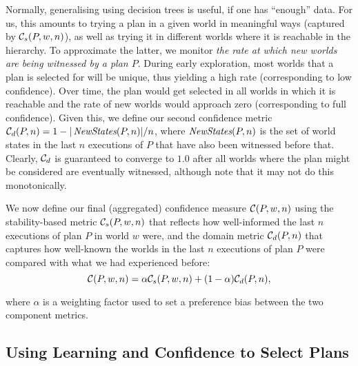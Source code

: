\newcommand{\neww}{\mathname{NewStates}}
Normally, generalising using decision trees is useful, if one has ``enough'' data. For us, this amounts to trying a plan in a given world in meaningful ways (captured by ${\mathcal{C}}_s(P,w,n)$), as well as trying it in different worlds where it is reachable in the hierarchy. To approximate the latter, we monitor {\em the rate at which new worlds are being witnessed by a  plan $P$}. During early exploration, most worlds that a plan is selected for will be unique, thus yielding a high rate (corresponding to low confidence). Over time, the plan would get selected in all worlds in which it is reachable and the rate of new worlds would approach zero (corresponding to full confidence). Given this, we define our second confidence metric $\C_d(P,n) = 1 - |\neww(P,n)|/n$, where $\neww(P,n)$ is the set of world states in the last $n$ executions of $P$ that have also been witnessed before that. Clearly, ${\mathcal{C}}_d$ is guaranteed to converge to $1.0$ after all worlds where the plan might be considered are eventually witnessed, although note that it may not do this monotonically.

We now define our final (aggregated) confidence measure ${\mathcal{C}}(P,w,n)$ using the stability-based metric ${\mathcal{C}}_s(P,w,n)$ that reflects how well-informed the last $n$ executions of plan $P$ in world $w$ were, and the domain metric ${\mathcal{C}}_d(P,n)$ that captures how well-known the worlds in the last $n$ executions of plan $P$ were compared with what we had experienced before:
\[
	{\mathcal{C}}(P,w,n) = \alpha{\ensuremath{\mathcal{C}}}_s(P,w,n) + (1-\alpha){\mathcal{C}}_d(P,n),
\label{eqn:confidence}
\]

\noindent
where $\alpha$ is a weighting factor used to set a preference bias between the two component metrics.

\subsection{Using Learning and Confidence to Select Plans}\label{sec:selection}

\newcommand{\aSet}{\mathname{set}}
\newcommand{\aOperate}{\mathname{operate}}
\newcommand{\aEvaluate}{\mathname{evaluate}}

\newcommand{\pSet}{\mathname{Set*}}
\newcommand{\pSetCharge}{\mathname{SetCharge}}
\newcommand{\pSetDischarge}{\mathname{SetDischarge}}
\newcommand{\pSetNotUsed}{\mathname{SetNotUsed}}
\newcommand{\pExecute}{\mathname{Execute}}

\newcommand{\cSatisfies}{\psi}


